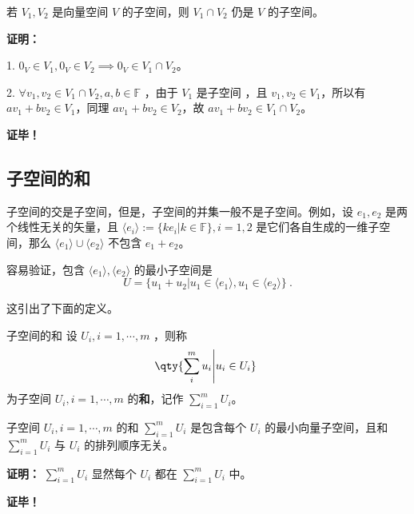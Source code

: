 \begin{theorem}{}\label{the_SubSpc_1}
若 $V_1, V_2$ 是向量空间 $V$ 的子空间，则 $V_1 \cap V_2$ 仍是 $V$ 的子空间。
\end{theorem}
\textbf{证明：}

1. $0_V \in V_1, 0_V \in V_2 \implies 0_V \in V_1 \cap V_2$。

2. $\forall v_1,v_2 \in V_1 \cap V_2, a, b \in \mathbb{F}$ ，由于 $V_1$ 是子空间 ，且 $v_1, v_2 \in V_1$，所以有 $a v_1 + b v_2 \in V_1$，同理 $a v_1 + b v_2 \in V_2$，故 $a v_1 + b v_2 \in V_1 \cap V_2$。

\textbf{证毕！}

\subsection{子空间的和}
子空间的交是子空间，但是，子空间的并集一般不是子空间。例如，设 $e_1,e_2$ 是两个线性无关的矢量，且 $\langle e_i\rangle:=\{k e_i|k\in\mathbb F\},i=1,2$ 是它们各自生成的一维子空间，那么 $\langle e_1\rangle\cup \langle e_2\rangle$ 不包含 $e_1+e_2$。

容易验证，包含 $\langle e_1\rangle,\langle e_2\rangle$ 的最小子空间是
\begin{equation}
U=\{u_1+u_2|u_1\in \langle e_1\rangle,u_1\in\langle e_2\rangle\}~.
\end{equation}

这引出了下面的定义。
\begin{definition}{子空间的和}
设 $U_i,i=1,\cdots,m$ ，则称
\begin{equation}
\qty{\sum_{i}^m u_i\Bigg|u_i\in U_i}~
\end{equation}
为子空间 $U_i,i=1,\cdots,m$ 的\textbf{和}，记作 $\sum_{i=1}^m U_i$。
\end{definition}

\begin{theorem}{}
子空间 $U_i,i=1,\cdots,m$ 的和 $\sum_{i=1}^m U_i$ 是包含每个 $U_i$ 的最小向量子空间，且和 $\sum_{i=1}^m U_i$ 与 $U_i$ 的排列顺序无关。
\end{theorem}
\textbf{证明：} \textbf{$\sum_{i=1}^m U_i$ }显然每个 $U_i$ 都在 $\sum_{i=1}^m U_i$ 中。


\textbf{证毕！}
